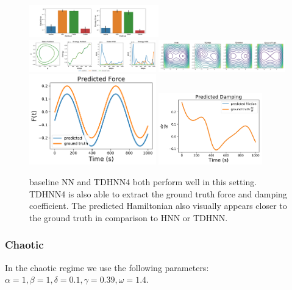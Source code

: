 \documentclass[twoside]{article}
\begin{document}
\begin{figure}[h!]
\centering
\includegraphics[width=0.5\textwidth]{figures/duffing_1_errors.pdf}
\includegraphics[width=0.49\textwidth]{figures/duffing_1_pred.pdf}
\includegraphics[width=0.49\textwidth]{figures/duffing_ham_1.pdf}
\includegraphics[width=0.49\textwidth]{figures/TDHNN4_duffing_1.pdf}
\includegraphics[width=0.4\textwidth]{figures/TDHNN4_duffing_damp_1.pdf}
\caption{baseline NN and TDHNN4 both perform well in this setting. TDHNN4 is also able to extract the ground truth force and damping coefficient. The predicted Hamiltonian also visually appears closer to the ground truth in comparison to HNN or TDHNN.}
\end{figure}

\subsubsection{Chaotic}

In the chaotic regime we use the following parameters:
$\alpha =1,\beta=1,\delta=0.1,\gamma=0.39,\omega=1.4$. 
\end{document}
